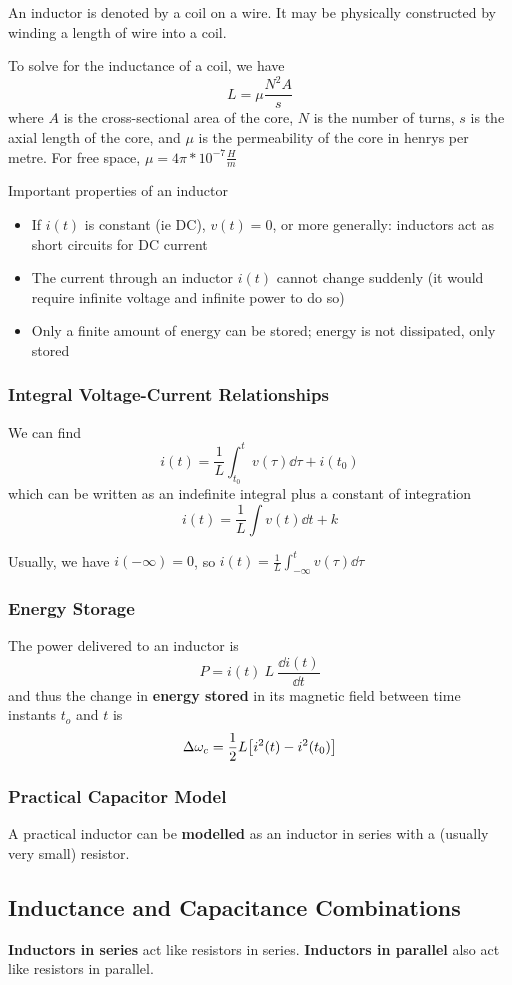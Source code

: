 \documentclass[12pt]{article}
\begin{document}
An inductor is denoted by a coil on a wire. It may be physically constructed by winding a length of wire into a coil.

To solve for the inductance of a coil, we have \[ L = \mu \frac{N^2 A}{s} \] where $A$ is the cross-sectional area of the core, $N$ is the number of turns, $s$ is the axial length of the core, and $\mu$ is the permeability of the core in henrys per metre. For free space, $\mu = 4\pi * 10^{-7} \frac{H}{m}$

Important properties of an inductor
\begin{itemize}
\item If $i(t)$ is constant (ie DC), $v(t) = 0$, or more generally: inductors act as short circuits for DC current
\item The current through an inductor $i(t)$ cannot change suddenly (it would require infinite voltage and infinite power to do so)
\item Only a finite amount of energy can be stored; energy is not dissipated, only stored
\end{itemize}

\subsubsection*{Integral Voltage-Current Relationships}
We can find \[ i(t) = \frac{1}{L} \int_{t_0}^t v(\tau) \dd\tau + i(t_0) \] which can be written as an indefinite integral plus a constant of integration \[ i(t) = \frac{1}{L} \int v(t) \dd t + k \]

Usually, we have $i(-\infty) = 0$, so $i(t) = \frac{1}{L} \int_{-\infty}^t v(\tau) \dd\tau$

\subsubsection*{Energy Storage}
The power delivered to an inductor is \[ P = i(t)\ L\ \frac{\dd i(t)}{\dd t} \] and thus the change in {\bf energy stored} in its magnetic field between time instants $t_o$ and $t$ is \[ \Delta\omega_c = \frac{1}{2} L\bigl[i^2(t) - i^2(t_0)\bigl] \]

\subsubsection*{Practical Capacitor Model}
A practical inductor can be {\bf modelled} as an inductor in series with a (usually very small) resistor.

\subsection*{Inductance and Capacitance Combinations}
{\bf Inductors in series} act like resistors in series. {\bf Inductors in parallel} also act like resistors in parallel.
\end{document}
